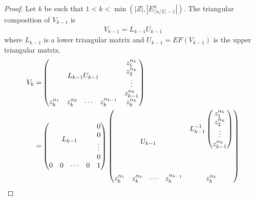 \documentclass[11pt]{llncs}
\begin{document}
\begin{proof}
    Let $k$ be such that $1<k< \min{\left(|Z|,|E_{\lceil{n/2}\rceil-1}^n|\right)}$. The triangular composition of $V_{k-1}$ is
    \begin{align*}
        V_{k-1} = L_{k-1} U_{k-1}
    \end{align*}
    where $L_{k-1}$ is a lower triangular matrix and $U_{k-1} = EF\left(V_{k-1}\right)$ is the upper triangular matrix.
    \begin{align*}
        V_{k} = &
        \begin{pmatrix}
            \multicolumn{4}{c}{\multirow{4}{*}{$L_{k-1}U_{k-1}$}} & z_1^{\alpha_k}\\
            & & & & z_2^{\alpha_k}\\
            & & & & \vdots\\
            & & & & z_{k-1}^{\alpha_{k}}\\
            z_k^{\alpha_{1}} & z_k^{\alpha_{2}}& \cdots & z_{k}^{\alpha_{k-1}} & z_{k}^{\alpha_k}
        \end{pmatrix}\\
        = &  
        \begin{pmatrix}
            \multicolumn{4}{c}{\multirow{4}{*}{$L_{k-1}$}} & 0\\
            & & & & 0\\
            & & & & \vdots\\
            & & & & 0\\
            0 & 0& \cdots & 0 & 1
        \end{pmatrix}
        \begin{pmatrix}
            \multicolumn{4}{c}{\phantom{a}\multirow{4}{*}{$U_{k-1}$}\phantom{a}} & L_{k-1}^{-1}
                \begin{pmatrix}
                    z_1^{\alpha_k}\\
                    z_2^{\alpha_k}\\
                \vdots\\
                z_{k-1}^{\alpha_{k}}
            \end{pmatrix}\\
            \multicolumn{4}{c}{} & \\
            \multicolumn{4}{c}{} & \\
            \multicolumn{4}{c}{} & \\
            z_k^{\alpha_{1}} & z_k^{\alpha_{2}} & \cdots & z_{k}^{\alpha_{k-1}} & z_{k}^{\alpha_k}
        \end{pmatrix}

\end{align*}
\end{proof}
\end{document}
